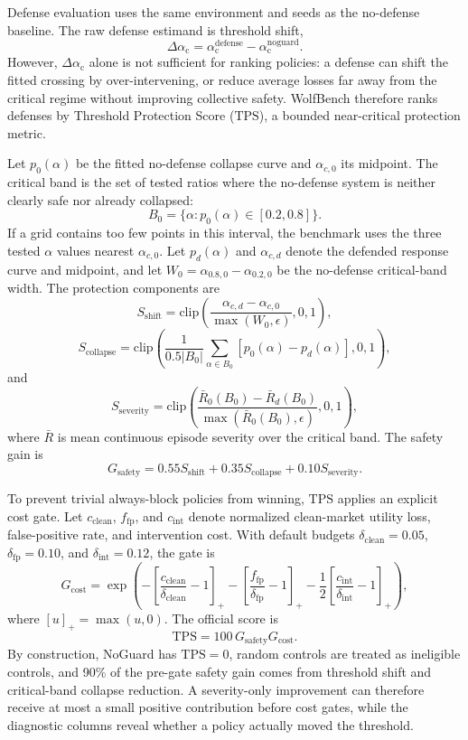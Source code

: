 \documentclass[letterpaper]{article} %
\newcommand{\alphac}{\alpha_{\mathrm{c}}}
\newcommand{\shift}{\Delta\alpha_{\mathrm{c}}}
\newcommand{\tps}{\mathrm{TPS}}
\begin{document}
Defense evaluation uses the same environment and seeds as the no-defense
baseline. The raw defense estimand is threshold shift,
\[
    \shift=\alphac^{\mathrm{defense}}-\alphac^{\mathrm{noguard}}.
\]
However, \(\shift\) alone is not sufficient for ranking policies: a defense can
shift the fitted crossing by over-intervening, or reduce average losses far
away from the critical regime without improving collective safety. WolfBench
therefore ranks defenses by Threshold Protection Score (\(\tps\)), a bounded
near-critical protection metric.

Let \(p_0(\alpha)\) be the fitted no-defense collapse curve and
\(\alpha_{c,0}\) its midpoint. The critical band is the set of tested ratios
where the no-defense system is neither clearly safe nor already collapsed:
\[
    B_0=\{\alpha: p_0(\alpha)\in[0.2,0.8]\}.
\]
If a grid contains too few points in this interval, the benchmark uses the
three tested \(\alpha\) values nearest \(\alpha_{c,0}\). Let \(p_d(\alpha)\)
and \(\alpha_{c,d}\) denote the defended response curve and midpoint, and let
\(W_0=\alpha_{0.8,0}-\alpha_{0.2,0}\) be the no-defense critical-band width.
The protection components are
\[
    S_{\mathrm{shift}}=
    \mathrm{clip}\!\left(
    \frac{\alpha_{c,d}-\alpha_{c,0}}{\max(W_0,\epsilon)},0,1
    \right),
\]
\[
    S_{\mathrm{collapse}}=
    \mathrm{clip}\!\left(
    \frac{1}{0.5|B_0|}
    \sum_{\alpha\in B_0}\left[p_0(\alpha)-p_d(\alpha)\right],0,1
    \right),
\]
and
\[
    S_{\mathrm{severity}}=
    \mathrm{clip}\!\left(
    \frac{\bar{R}_0(B_0)-\bar{R}_d(B_0)}{\max(\bar{R}_0(B_0),\epsilon)},0,1
    \right),
\]
where \(\bar{R}\) is mean continuous episode severity over the critical band.
The safety gain is
\[
    G_{\mathrm{safety}}=
    0.55S_{\mathrm{shift}}+
    0.35S_{\mathrm{collapse}}+
    0.10S_{\mathrm{severity}}.
\]

To prevent trivial always-block policies from winning, \(\tps\) applies an
explicit cost gate. Let \(c_{\mathrm{clean}}\), \(f_{\mathrm{fp}}\), and
\(c_{\mathrm{int}}\) denote normalized clean-market utility loss,
false-positive rate, and intervention cost. With default budgets
\(\delta_{\mathrm{clean}}=0.05\), \(\delta_{\mathrm{fp}}=0.10\), and
\(\delta_{\mathrm{int}}=0.12\), the gate is
\[
    G_{\mathrm{cost}}=
    \exp\!\left(
    -\left[\frac{c_{\mathrm{clean}}}{\delta_{\mathrm{clean}}}-1\right]_+
    -\left[\frac{f_{\mathrm{fp}}}{\delta_{\mathrm{fp}}}-1\right]_+
    -\frac{1}{2}\left[\frac{c_{\mathrm{int}}}{\delta_{\mathrm{int}}}-1\right]_+
    \right),
\]
where \([u]_+=\max(u,0)\). The official score is
\[
    \tps = 100\,G_{\mathrm{safety}}G_{\mathrm{cost}}.
\]
By construction, NoGuard has \(\tps=0\), random controls are treated as
ineligible controls, and 90\% of the pre-gate safety gain comes from threshold
shift and critical-band collapse reduction. A severity-only improvement can
therefore receive at most a small positive contribution before cost gates, while
the diagnostic columns reveal whether a policy actually moved the threshold.
\end{document}
